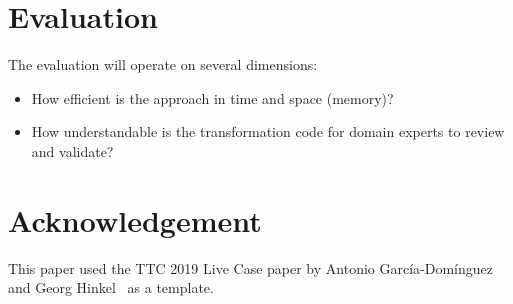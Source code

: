 \documentclass[
twocolumn,
]{ceurart}
\begin{document}
\section{Evaluation}
\label{sec:evaluation}

The evaluation will operate on several dimensions:

\begin{itemize}
\item How efficient is the approach in time and space (memory)?

\item How understandable is the transformation code for domain experts to review and validate?
\end{itemize}

\section*{Acknowledgement}

This paper used the TTC 2019 Live Case paper by Antonio García-Domínguez and
Georg Hinkel~\cite{garcia_dominguez_ttc_2019} as a template.



\end{document}
